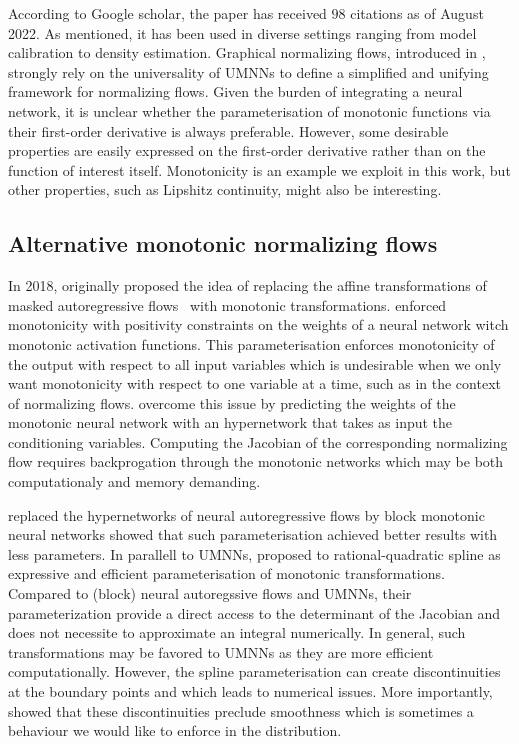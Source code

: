 According to Google scholar, the paper has received $98$ citations as of August 2022. As mentioned, it has been used in diverse settings ranging from model calibration to density estimation. Graphical normalizing flows, introduced in , strongly rely on the universality of UMNNs to define a simplified and unifying framework for normalizing flows. Given the burden of integrating a neural network, it is unclear whether the parameterisation of monotonic functions via their first-order derivative is always preferable. However, some desirable properties are easily expressed on the first-order derivative rather than on the function of interest itself. Monotonicity is an example we exploit in this work, but other properties, such as Lipshitz continuity, might also be interesting.
\subsection{Alternative monotonic normalizing flows}
In 2018, \citet{huang_neural_2018} originally proposed the idea of replacing the affine transformations of masked autoregressive flows~\citep{papamakarios_masked_2017} with monotonic transformations. \citet{huang_neural_2018} enforced monotonicity with positivity constraints on the weights of a neural network witch monotonic activation functions. This parameterisation enforces monotonicity of the output with respect to all input variables which is undesirable when we only want monotonicity with respect to one variable at a time, such as in the context of normalizing flows. \citet{huang_neural_2018} overcome this issue by predicting the weights of the monotonic neural network with an hypernetwork that takes as input the conditioning variables. Computing the Jacobian of the corresponding normalizing flow requires backprogation through the monotonic networks which may be both computationaly and memory demanding.

\citet{de_cao_block_2020} replaced the hypernetworks of neural autoregressive flows by block monotonic neural networks showed that such parameterisation achieved better results with less parameters. In parallell to UMNNs, \citet{durkan_neural_2019} proposed to rational-quadratic spline as expressive and efficient parameterisation of monotonic transformations. Compared to (block) neural autoregssive flows and UMNNs, their parameterization provide a direct access to the determinant of the Jacobian and does not necessite to approximate an integral numerically. In general, such transformations may be favored to UMNNs as they are more efficient computationally. However, the spline parameterisation can create discontinuities at the boundary points and which leads to numerical issues. More importantly, \citet{kohler2021smooth} showed that these discontinuities preclude smoothness which is sometimes a behaviour we would like to enforce in the distribution.

